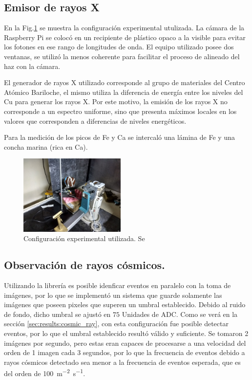 \documentclass[twoside,twocolumn]{article}
\begin{document}
    \subsection{Emisor de rayos X}\label{sec:conf_exp:x-rays}
      En la Fig.\ref{fig:photo_xray} se muestra la configuración experimental utulizada.
      La cámara de la Raspberry Pi se colocó en un recipiente de plástico opaco a la visible
      para evitar los fotones en ese rango de longitudes de onda.
      El equipo utilizado posee dos ventanas, se utilizó la menos coherente para facilitar el proceso
      de alineado del haz con la cámara. 

      El generador de rayos X utilizado corresponde al grupo de materiales del Centro Atómico Bariloche,
      el mismo utiliza la diferencia de energía entre los niveles del Cu para generar los rayos X.
      Por este motivo, la emisión de los rayos X no corresponde a un espectro uniforme, sino que presenta
      máximos locales en los valores que corresponden a diferencias de niveles energéticos.
      
      Para la medición de los picos de Fe y Ca se intercaló una lámina de Fe y una concha marina (rica en Ca).

      \begin{figure}[h]
        \includegraphics[width=0.47\textwidth]{figures/IMG_20180412_173110355_HDR}
        \caption{Configuración experimental utilizada. Se } %
        \label{fig:photo_xray}
      \end{figure}

    \subsection{Observación de rayos cósmicos.}\label{sec:conf_exp:cosmic_ray}
      Utilizando la librería es posible idenficar eventos en paralelo con la toma de imágenes,
      por lo que se implementó un sistema que guarde solamente las imágenes que poseen pixeles que superen un umbral establecido.
      Debido al ruido de fondo, dicho umbral se ajustó en $75$ Unidades de ADC. 
      Como se verá en la sección \ref{sec:results:cosmic_ray}, con esta configuración fue posible detectar eventos,
      por lo que el umbral establecido resultó válido y suficiente.
      Se tomaron 2 imágenes por segundo, pero estas eran capaces de procesarse a una velocidad
      del orden de 1 imagen cada 3 segundos, por lo que la frecuencia de eventos debido a rayos cósmicos detectado sea menor a
      la frecuencia de eventos esperada, que es del orden de \SI{100}{\meter^{-2}\second^{-1}}.
\end{document}
